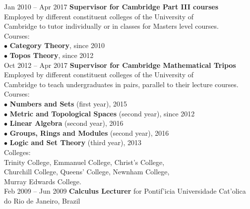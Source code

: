 \documentclass[11pt,a4paper]{article}
\begin{document}
\begin{tabbing}
\> Jan 2010 -- Apr 2017  \' \textbf{Supervisor for Cambridge Part III courses}\\ 
\> Employed by different constituent colleges of the University of \\ \> Cambridge  to tutor individually or in classes for Masters level courses.\\
\> Courses: \\
\> \> $\bullet$ {\bf Category Theory}, since 2010 \\ 
\> \> $\bullet$ {\bf Topos Theory}, since 2012\\ [5mm]
\> Oct 2012 -- Apr 2017 \' \textbf{Supervisor for Cambridge Mathematical Tripos}\\
\> Employed by different constituent colleges of the University of \\ \> Cambridge to teach undergraduates in pairs, parallel to their lecture courses.\\
\> Courses: \\ 
\> \> $\bullet$ {\bf Numbers and Sets} (first year), 2015 \\
\> \> $\bullet$ {\bf Metric and Topological Spaces} (second year), since 2012\\
\> \> $\bullet$ {\bf Linear Algebra} (second year), 2016\\
\> \> $\bullet$ {\bf Groups, Rings and Modules} (second year), 2016\\
\> \> $\bullet$ {\bf Logic and Set Theory} (third year), 2013\\
\> Colleges: \\
\> \> Trinity College, Emmanuel College, Christ's College, \\ 
\> \> Churchill College, Queens' College, Newnham College,\\ 
\> \> Murray Edwards College.\\ [5mm]
\> Feb 2009 -- Jun 2009 \' \textbf{Calculus Lecturer} for Pontif\a'icia Universidade Cat\a'olica\\ \> do Rio de Janeiro, Brazil\\ 
\end{tabbing}
\end{document}
